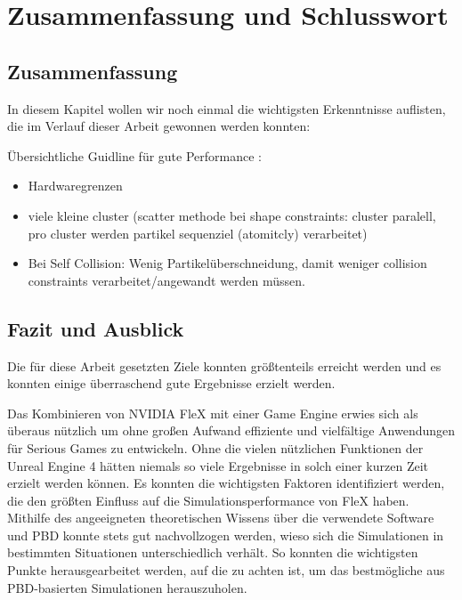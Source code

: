 \chapter{Zusammenfassung und Schlusswort}

\section{Zusammenfassung}

In diesem Kapitel wollen wir noch einmal die wichtigsten Erkenntnisse auflisten, die im Verlauf dieser Arbeit gewonnen werden konnten:

Übersichtliche Guidline für gute Performance :

    \begin{itemize}
    
      \item Hardwaregrenzen
      
      \item viele kleine cluster (scatter methode bei shape constraints: cluster paralell, pro cluster werden partikel sequenziel (atomitcly) verarbeitet)
      
      \item Bei Self Collision: Wenig Partikelüberschneidung, damit weniger collision constraints verarbeitet/angewandt werden müssen.
      
    \end{itemize}
    

\section{Fazit und Ausblick}
Die für diese Arbeit gesetzten Ziele konnten größtenteils erreicht werden und es konnten einige überraschend gute Ergebnisse erzielt werden. 

Das Kombinieren von NVIDIA FleX mit einer Game Engine erwies sich als überaus nützlich um ohne großen Aufwand effiziente und vielfältige Anwendungen für Serious Games zu entwickeln. 
Ohne die vielen nützlichen Funktionen der Unreal Engine 4 hätten niemals so viele Ergebnisse in solch einer kurzen Zeit erzielt werden können. 
Es konnten die wichtigsten Faktoren identifiziert werden, die den größten Einfluss auf die Simulationsperformance von FleX haben. Mithilfe des angeeigneten theoretischen Wissens über die verwendete Software und PBD konnte stets gut nachvollzogen werden, wieso sich die Simulationen in bestimmten Situationen unterschiedlich verhält. So konnten die wichtigsten Punkte herausgearbeitet werden, auf die zu achten ist, um das bestmögliche aus PBD-basierten Simulationen herauszuholen.

